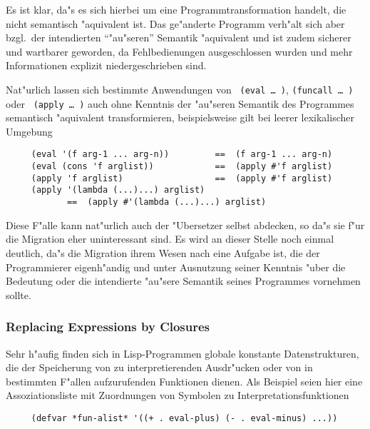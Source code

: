 Es ist klar, da"s es sich hierbei um eine Programmtransformation
handelt, die nicht semantisch "aquivalent ist. Das ge"anderte Programm
verh"alt sich aber bzgl.\ der intendierten "`"au"seren"' Semantik
"aquivalent und ist zudem sicherer und wartbarer geworden, da
Fehlbedienungen ausgeschlossen wurden und mehr Informationen explizit
niedergeschrieben sind.

Nat"urlich lassen sich bestimmte Anwendungen von {\tt
(eval\,\ldots\,)}, {\tt (funcall\,\ldots\,)} oder {\tt
(apply\,\ldots\,)} auch ohne Kenntnis der "au"seren Semantik des
Programmes semantisch "aquivalent transformieren, beispielsweise gilt
bei leerer lexikalischer Umgebung

\begin{verbatim}
     (eval '(f arg-1 ... arg-n))         ==  (f arg-1 ... arg-n)
     (eval (cons 'f arglist))            ==  (apply #'f arglist)
     (apply 'f arglist)                  ==  (apply #'f arglist)
     (apply '(lambda (...)...) arglist)  
            ==  (apply #'(lambda (...)...) arglist)
\end{verbatim}
 
Diese F"alle kann nat"urlich auch der "Ubersetzer selbst abdecken, so
da"s sie f"ur die Migration eher uninteressant sind. Es wird an dieser
Stelle noch einmal deutlich, da"s die Migration ihrem Wesen nach eine
Aufgabe ist, die der Programmierer eigenh"andig und unter Ausnutzung
seiner Kenntnis "uber die Bedeutung oder die intendierte "au"sere
Semantik seines Programmes vornehmen sollte.

\subsubsection*{Replacing Expressions by Closures}

Sehr h"aufig finden sich in Lisp-Programmen globale konstante
Datenstrukturen, die der Speicherung von zu interpretierenden
Ausdr"ucken oder von in bestimmten F"allen aufzurufenden Funktionen
dienen. Als Beispiel seien hier eine Assoziationsliste mit Zuordnungen
von Symbolen zu Interpretationsfunktionen

\begin{verbatim}
     (defvar *fun-alist* '((+ . eval-plus) (- . eval-minus) ...))
\end{verbatim}

